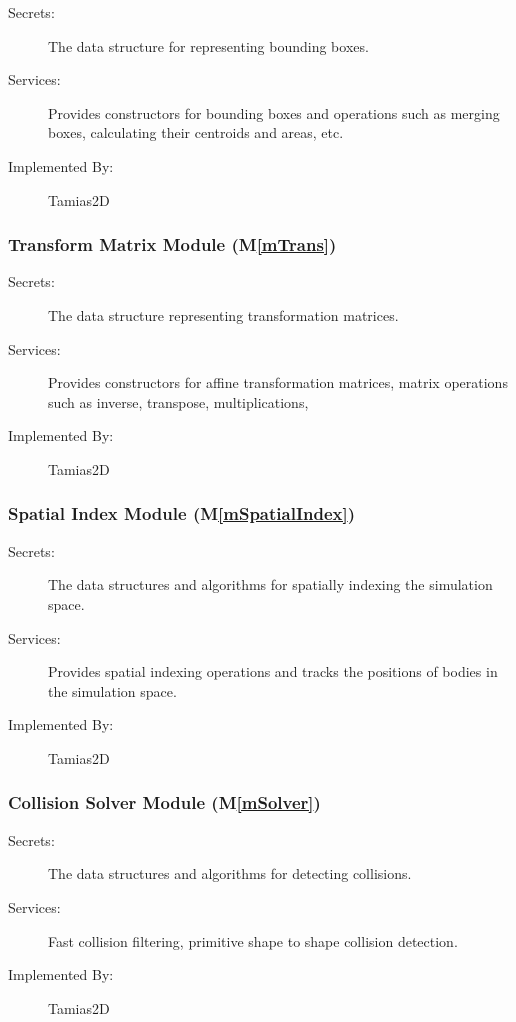 \documentclass[12pt]{article}
\newcommand{\mref}[1]{M\ref{#1}}
\newcommand{\progname}{Tamias2D}
\begin{document}
\begin{description}
	\item[Secrets:] The data structure for representing bounding boxes.
	\item[Services:] Provides constructors for bounding boxes and operations such as merging boxes, calculating their centroids and areas, etc.
	\item[Implemented By:] {\progname}
\end{description}

\subsubsection{Transform Matrix Module (\mref{mTrans})}

\begin{description}
	\item[Secrets:] The data structure representing transformation matrices.
	\item[Services:] Provides constructors for affine transformation matrices, matrix operations such as inverse, transpose, multiplications, %
	\item[Implemented By:] {\progname}
\end{description}

\subsubsection{Spatial Index Module (\mref{mSpatialIndex})}

\begin{description}
	\item[Secrets:] The data structures and algorithms for spatially indexing the simulation space.
	\item[Services:] Provides spatial indexing operations and tracks the positions of bodies in the simulation space.
	\item[Implemented By:] {\progname}
\end{description}

\subsubsection{Collision Solver Module (\mref{mSolver})}

\begin{description}
	\item[Secrets:] The data structures and algorithms for detecting collisions.
	\item[Services:] Fast collision filtering, primitive shape to shape collision detection.
	\item[Implemented By:] {\progname}
\end{description}
\end{document}
